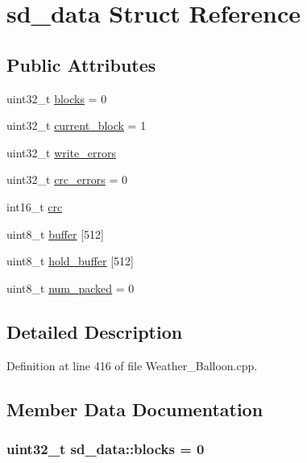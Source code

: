 \hypertarget{structsd__data}{}\section{sd\+\_\+data Struct Reference}
\label{structsd__data}
\subsection*{Public Attributes}
\begin{DoxyCompactItemize}
\item 
uint32\+\_\+t \hyperlink{structsd__data_a5ebf26ae306ca7d48713664f309ef62f}{blocks} = 0
\item 
uint32\+\_\+t \hyperlink{structsd__data_a2d9191a0c849f5ee3b3714159dbd065d}{current\+\_\+block} = 1
\item 
uint32\+\_\+t \hyperlink{structsd__data_ac1410d5750aa9c7a30041b0ac94cbc80}{write\+\_\+errors}
\item 
uint32\+\_\+t \hyperlink{structsd__data_a803add843065a08b411291e34786dac3}{crc\+\_\+errors} = 0
\item 
int16\+\_\+t \hyperlink{structsd__data_a3e3831d75c0cbbc4f4bc83f20c57c4d7}{crc}
\item 
uint8\+\_\+t \hyperlink{structsd__data_ab3590a9446d96dd2d7527a8b69d6a7e4}{buffer} \mbox{[}512\mbox{]}
\item 
uint8\+\_\+t \hyperlink{structsd__data_a8c7d8aeb42db3bbd384026be5d5e0bbd}{hold\+\_\+buffer} \mbox{[}512\mbox{]}
\item 
uint8\+\_\+t \hyperlink{structsd__data_ada768338826445661ce665fc7bb9b8a0}{num\+\_\+packed} = 0
\end{DoxyCompactItemize}


\subsection{Detailed Description}


Definition at line 416 of file Weather\+\_\+\+Balloon.\+cpp.



\subsection{Member Data Documentation}
\subsubsection[{\texorpdfstring{blocks}{blocks}}]{\setlength{\rightskip}{0pt plus 5cm}uint32\+\_\+t sd\+\_\+data\+::blocks = 0}\hypertarget{structsd__data_a5ebf26ae306ca7d48713664f309ef62f}{}\label{structsd__data_a5ebf26ae306ca7d48713664f309ef62f}


